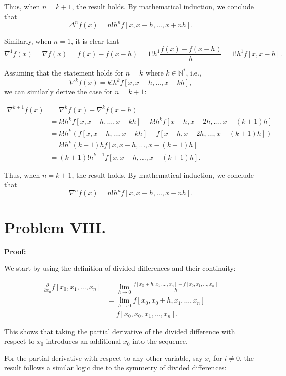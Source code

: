 \documentclass[a4paper]{article}
\renewcommand{\qed}{\hfill \boxed{\mathbb{Q.E.D.}}}
\begin{document}
Thus, when \( n=k+1 \), the result holds. By mathematical induction, we conclude that 
\[
\Delta^n f(x) = n! h^n f[x, x+h, \ldots, x+nh].
\]

Similarly, when \( n=1 \), it is clear that 
\[
\nabla^1 f(x) = \nabla f(x) = f(x) - f(x-h) = 1! h^1 \frac{f(x) - f(x-h)}{h} = 1! h^1 f[x, x-h].
\]

Assuming that the statement holds for \( n=k \) where \( k \in \mathbb{N}^* \), i.e., 
\[
\nabla^k f(x) = k! h^k f[x, x-h, \ldots, x-kh],
\]
we can similarly derive the case for \( n=k+1 \):

\[
\begin{aligned}
\nabla^{k+1} f(x) & = \nabla^k f(x) - \nabla^k f(x-h) \\
& = k! h^k f[x, x-h, \ldots, x-kh] - k! h^k f[x-h, x-2h, \ldots, x-(k+1)h] \\
& = k! h^k \left( f[x, x-h, \ldots, x-kh] - f[x-h, x-2h, \ldots, x-(k+1)h] \right) \\
& = k! h^k (k+1) h f[x, x-h, \ldots, x-(k+1)h] \\
& = (k+1)! h^{k+1} f[x, x-h, \ldots, x-(k+1)h].
\end{aligned}
\]

Thus, when \( n=k+1 \), the result holds. By mathematical induction, we conclude that 
\[
\nabla^n f(x) = n! h^n f[x, x-h, \ldots, x-nh].
\]

\qed


\section*{Problem VIII.}

\textbf{Proof:}

We start by using the definition of divided differences and their continuity:

\[
\begin{aligned}
    \frac{\partial}{\partial x_0} f[x_0, x_1, \dots, x_n] &= \lim_{h \to 0} \frac{f[x_0 + h, x_1, \dots, x_n] - f[x_0, x_1, \dots, x_n]}{h} \\
    &= \lim_{h \to 0} f[x_0, x_0 + h, x_1, \dots, x_n] \\
    &= f[x_0, x_0, x_1, \dots, x_n].
\end{aligned}
\]

This shows that taking the partial derivative of the divided difference with respect to \(x_0\) introduces an additional \(x_0\) into the sequence.

For the partial derivative with respect to any other variable, say \(x_i\) for \(i \neq 0\), the result follows a similar logic due to the symmetry of divided differences:
\end{document}
